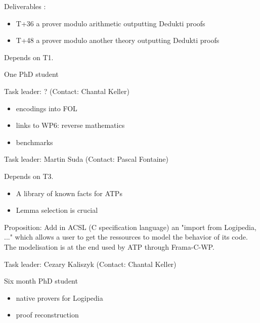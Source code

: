 \begin{workpackage}[id=atpetc,wphases=0-48,type=RTD,
  short=ATPs etc.,%
  title={ATP, SAT, SMT, Model checkers},
  lead=Lie,
  LieRM=10]
\begin{tasklist}
\begin{task}[id=tracetodedukti, title=Translate ATP traces into Dedukti]
\begin{compactenum}
  Deliverables :
  \begin{itemize}
  \item T+36 a prover modulo arithmetic outputting Dedukti proofs
  \item T+48 a prover modulo another theory outputting Dedukti proofs
  \end{itemize}

\end{compactenum}
  Depends on T1.

  One PhD student
  
\end{task}


\begin{task}[id=deduktitoatp, title=Translate Dedukti statements into ATPs inputs]
Task leader: ? (Contact: Chantal Keller)

\begin{itemize}
\item encodings into FOL
\item links to WP6: reverse mathematics
\item benchmarks
\end{itemize}

\end{task}


\begin{task}[id=library, title=Logipedia as a source of knowledge for ATP]
  Task leader: Martin Suda (Contact: Pascal Fontaine)

Depends on T3.

\begin{itemize}
\item A library of known facts for ATPs
\item Lemma selection is crucial
\end{itemize}

Proposition: Add in ACSL (C specification language) an "import from
Logipedia, ..." which allows a user to get the ressources to model the
behavior of its code. The modelisation is at the end used by ATP through
Frama-C-WP.

\end{task}


\begin{task}[id=reconstruction, title=ATPs for Logipedia]
  Task leader: Cezary Kaliszyk (Contact: Chantal Keller)

  Six month PhD student

\begin{itemize}
\item native provers for Logipedia
\item proof reconstruction
\end{itemize}


\end{task}
\end{tasklist}
\end{workpackage}
